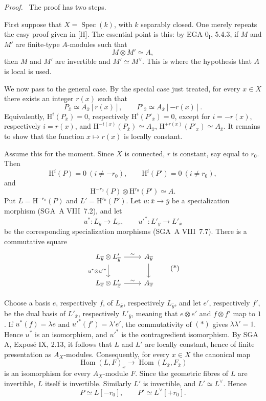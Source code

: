 \documentclass[11pt]{article}
\providecommand{\Hh}{\mathrm{H}}
\newenvironment{prooftext}[1][Proof]{\par\noindent\emph{#1.}\ }{\par\medskip}
\renewcommand{\H}{\mathrm{H}}
\DeclareMathOperator{\Hom}{Hom}
\DeclareMathOperator{\Spec}{Spec}
\newcommand{\ol}[1]{\overline{#1}}
\providecommand{\Hom}{\operatorname{Hom}}
\providecommand{\Spec}{\operatorname{Spec}}
\providecommand{\Spec}{\operatorname{Spec}}
\providecommand{\Hom}{\operatorname{Hom}}
\providecommand{\Spec}{\operatorname{Spec}}
\providecommand{\Spec}{\operatorname{Spec}}
\begin{document}
\begin{prooftext}
The proof has two steps.

First suppose that $X=\Spec(k)$, with $k$ separably closed. One merely repeats the easy proof given in [H]. The essential point is this: by EGA $0_{\mathrm I}$, 5.4.3, if $M$ and $M'$ are finite-type $A$-modules such that
\[
   M\otimes M'\simeq A,
\]
then $M$ and $M'$ are invertible and $M'\simeq M^\vee$. This is where the hypothesis that $A$ is local is used.

We now pass to the general case. By the special case just treated, for every $x\in X$ there exists an integer $r(x)$ such that
\[
   P_{\ol{x}}\simeq A_{\ol{x}}[r(x)],\qquad
   P'_{\ol{x}}\simeq A_{\ol{x}}[-r(x)].
\]
Equivalently, $\H^i(P_{\ol{x}})=0$, respectively $\H^i(P'_{\ol{x}})=0$, except for $i=-r(x)$, respectively $i=r(x)$, and $\H^{-i(x)}(P_{\ol{x}})\simeq A_{\ol{x}}$, $\H^{+r(x)}(P'_{{x}})\simeq A_{\ol{x}}$. It remains to show that the function $x\mapsto r(x)$ is locally constant.

Assume this for the moment. Since $X$ is connected, $r$ is constant, say equal to $r_0$. Then
\[
   \Hh^i(P)=0\ (i\ne-r_0),\qquad \Hh^i(P')=0\ (i\ne r_0),
\]
and
\[
   \Hh^{-r_0}(P)\otimes\Hh^{r_0}(P')\simeq A.
\]
Put $L=\Hh^{-r_0}(P)$ and $L'=\Hh^{r_0}(P')$. Let $u:\ol{x}\to\ol{y}$ be a specialization morphism (SGA~A VIII~7.2), and let
\[
   u^*:L_{\ol{y}}\to L_{\ol{x}},\qquad u'^*:L'_{\ol{y}}\to L'_{\ol{x}}
\]
be the corresponding specialization morphisms (SGA~A VIII~7.7). There is a commutative square
\begin{equation}
\begin{tikzcd}
L_{\ol{y}}\otimes L'_{\ol{y}} \arrow[r,"\sim"] \arrow[d,"u^*\otimes u'^*"'] & A_{\ol{y}} \arrow[d] \\
L_{\ol{x}}\otimes L'_{\ol{x}} \arrow[r,"\sim"] & A_{\ol{x}}
\end{tikzcd}
\tag{*}
\end{equation}
\par\medskip
Choose a basis $e$, respectively $f$, of $L_{\ol{x}}$, respectively $L_{\ol{y}}$, and let $e'$, respectively $f'$, be the dual basis of $L'_{\ol{x}}$, respectively $L'_{\ol{y}}$, meaning that $e\otimes e'$ and $f\otimes f'$ map to $1$. If $u^*(f)=\lambda e$ and $u'^*(f')=\lambda'e'$, the commutativity of $(*)$ gives $\lambda\lambda'=1$. Hence $u^*$ is an isomorphism, and $u'^*$ is the contragredient isomorphism. By SGA A, Exposé IX, 2.13, it follows that $L$ and $L'$ are locally constant, hence of finite presentation as $A_X$-modules. Consequently, for every $x\in X$ the canonical map
\[
   \underline{\Hom}(L,F)_{\ol{x}}\longrightarrow\Hom(L_{\ol{x}},F_{\ol{x}})
\]
is an isomorphism for every $A_X$-module $F$. Since the geometric fibres of $L$ are invertible, $L$ itself is invertible. Similarly $L'$ is invertible, and $L'\simeq L^\vee$. Hence
\[
   P\simeq L[-r_0],\qquad P'\simeq L^\vee[+r_0].
\]


\end{prooftext}
\end{document}

